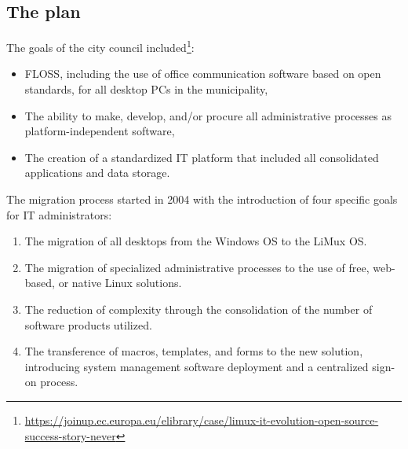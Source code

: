 \subsection{The plan}
The goals of the city council included\footnote{\url{https://joinup.ec.europa.eu/elibrary/case/limux-it-evolution-open-source-success-story-never}}:
\begin{itemize}
\item FLOSS, including the use of office communication software based on open standards, for all desktop PCs in the municipality,
\item The ability to make, develop, and/or procure all administrative processes as platform-independent software,
\item The creation of a standardized IT platform that included all consolidated applications and data storage.
\end{itemize}
The migration process started in 2004 with the introduction of four specific goals for IT administrators:
\begin{enumerate}
\item The migration of all desktops from the Windows OS to the LiMux OS.
\item The migration of specialized administrative processes to the use of free, web-based, or native Linux solutions.
 \item The reduction of complexity through the consolidation of the number of software products utilized.
\item The transference of macros, templates, and forms to the new solution, introducing system management software deployment and a centralized sign-on process. 
\end{enumerate}
